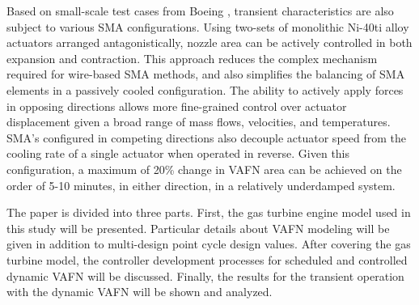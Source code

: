 Based on small-scale test cases from Boeing \cite{Mabe:2008,Mabe:2008:Paris},
transient characteristics are also subject to various SMA configurations.
Using two-sets of monolithic Ni-40ti alloy actuators arranged antagonistically, 
nozzle area can be actively controlled in both expansion and contraction. This
approach reduces the complex mechanism required for wire-based SMA methods,
and also simplifies the balancing of SMA elements in a passively cooled
configuration. The ability to actively apply forces in opposing directions
allows more fine-grained control over actuator displacement given a broad range
of mass flows, velocities, and temperatures. SMA's configured in competing
directions also decouple actuator speed from the cooling rate of a single
actuator when operated in reverse. Given this configuration, a maximum of 20\%
change in VAFN area can be achieved on the order of 5-10 minutes, in either
direction, in a relatively underdamped system.

The paper is divided into three parts. First, the gas turbine engine model used in 
this study will be presented. Particular details about VAFN modeling will be given 
in addition to multi-design point cycle design values. After covering the gas 
turbine model, the controller development processes for scheduled and controlled
dynamic VAFN will be discussed. Finally, the results for the transient operation 
with the dynamic VAFN will be shown and analyzed.